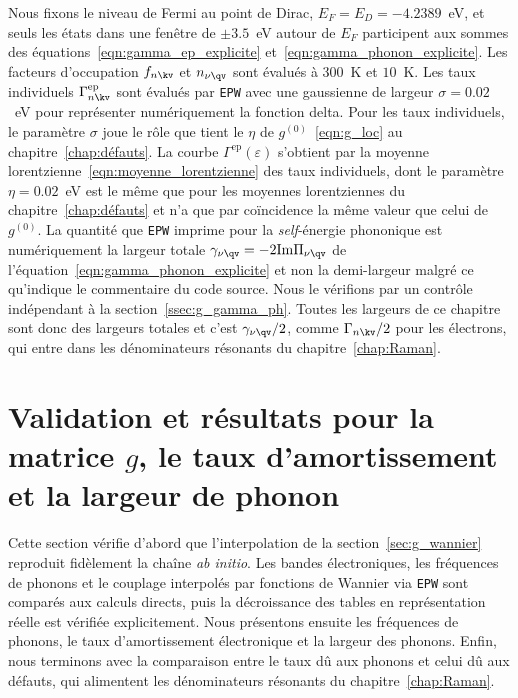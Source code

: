 Nous fixons le niveau de Fermi au point de Dirac, $E_F=E_D=-4.2389$~eV, et seuls les états dans une fenêtre de $\pm 3.5$~eV autour de $E_F$ participent aux sommes des équations~\eqref{eqn:gamma_ep_explicite} et~\eqref{eqn:gamma_phonon_explicite}. Les facteurs d'occupation $f_{n\kv}$ et $n_{\nu\qv}$ sont évalués à $300$~K et $10$~K. Les taux individuels $\Gamma_{n\kv}^\text{ep}$ sont évalués par \texttt{EPW} avec une gaussienne de largeur $\sigma=0.02$~eV pour représenter numériquement la fonction delta. Pour les taux individuels, le paramètre $\sigma$ joue le rôle que tient le $\eta$ de $g^{(0)}$~\eqref{eqn:g_loc} au chapitre~\ref{chap:défauts}. La courbe $\Gamma^\text{ep}(\varepsilon)$ s'obtient par la moyenne lorentzienne~\eqref{eqn:moyenne_lorentzienne} des taux individuels, dont le paramètre $\eta=0.02$~eV est le même que pour les moyennes lorentziennes du chapitre~\ref{chap:défauts} et n'a que par coïncidence la même valeur que celui de $g^{(0)}$. La quantité que \texttt{EPW} imprime pour la \textit{self}-énergie phononique est numériquement la largeur totale $\gamma_{\nu\qv}=-2\mathrm{Im}\Pi_{\nu\qv}$ de l'équation~\eqref{eqn:gamma_phonon_explicite} et non la demi-largeur malgré ce qu'indique le commentaire du code source. Nous le vérifions par un contrôle indépendant à la section~\ref{ssec:g_gamma_ph}. Toutes les largeurs de ce chapitre sont donc des largeurs totales et c'est $\gamma_{\nu\qv}/2$, comme $\Gamma_{n\kv}/2$ pour les électrons, qui entre dans les dénominateurs résonants du chapitre~\ref{chap:Raman}.

\section{Validation et résultats pour la matrice $g$, le taux d'amortissement et la largeur de phonon}\label{sec:g_results}

Cette section vérifie d'abord que l'interpolation de la section~\ref{sec:g_wannier} reproduit fidèlement la chaîne \textit{ab initio}. Les bandes électroniques, les fréquences de phonons et le couplage interpolés par fonctions de Wannier via \texttt{EPW} sont comparés aux calculs directs, puis la décroissance des tables en représentation réelle est vérifiée explicitement. Nous présentons ensuite les fréquences de phonons, le taux d'amortissement électronique et la largeur des phonons. Enfin, nous terminons avec la comparaison entre le taux dû aux phonons et celui dû aux défauts, qui alimentent les dénominateurs résonants du chapitre~\ref{chap:Raman}.

